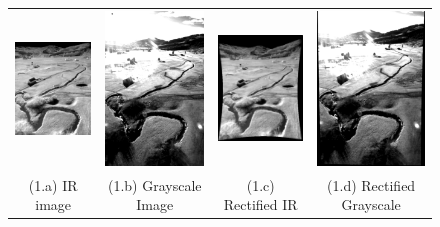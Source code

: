 \documentclass[runningheads]{llncs}
\begin{document}
\begin{figure}
  \centering
  \begin{tabular}{cccc}
    \includegraphics[width=3cm]{img/eps/fusion/Roth/Infrared_Image_screenshot.eps} &
    \includegraphics[width=3cm]{img/eps/fusion/Roth/Grayscale_Image_screenshot.eps} &
    \includegraphics[width=3cm]{img/eps/fusion/Roth/Warped_Infrared_Image_screenshot.eps} &
    \includegraphics[width=3cm]{img/eps/fusion/Roth/Warped_Grayscale_Image_screenshot.eps} \\
    \small (1.a) IR image & 
    \small (1.b) Grayscale Image &
    \small (1.c) Rectified IR &
    \small (1.d) Rectified Grayscale
  \end{tabular}

  \vspace{\floatsep}
  

\end{figure}
\end{document}

